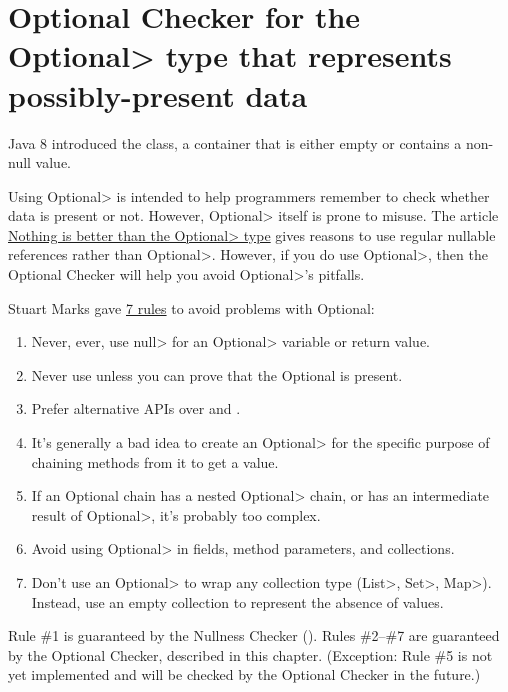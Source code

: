 \htmlhr
\chapter{Optional Checker for the \<Optional> type that represents possibly-present data\label{optional-checker}}

Java 8 introduced the 
class, a container that is either empty or contains a non-null value.

Using \<Optional> is intended to help programmers remember to check whether
data is present or not.  However, \<Optional> itself is prone to misuse.
The article
\href{https://homes.cs.washington.edu/~mernst/advice/nothing-is-better-than-optional.html}{Nothing
  is better than the \<Optional> type} gives reasons to use
regular nullable references rather than \<Optional>.  However, if you do use
\<Optional>, then the Optional Checker will help you avoid
\<Optional>'s pitfalls.

Stuart Marks gave
\href{https://stuartmarks.wordpress.com/2016/09/27/vjug24-session-on-optional/}{7
  rules} to avoid problems with Optional:
\begin{enumerate}
\item
  Never, ever, use \<null> for an \<Optional> variable or return value.
\item
  Never use  unless you can prove that the Optional is present.
\item
  Prefer alternative APIs over
  and .
\item
  It's generally a bad idea to create an \<Optional> for the specific
  purpose of chaining methods from it to get a value.
\item
  If an Optional chain has a nested \<Optional> chain, or has an
  intermediate result of \<Optional>, it's probably too complex.
\item
  Avoid using \<Optional> in fields, method parameters, and collections.
\item
  Don't use an \<Optional> to wrap any collection type (\<List>, \<Set>,
  \<Map>).  Instead, use an empty collection to represent the absence of
  values.
\end{enumerate}

Rule \#1 is guaranteed by the Nullness Checker
().
Rules \#2--\#7 are guaranteed by the Optional Checker, described in this chapter.
(Exception:  Rule \#5 is not yet implemented and will be checked by the
Optional Checker in the future.)

